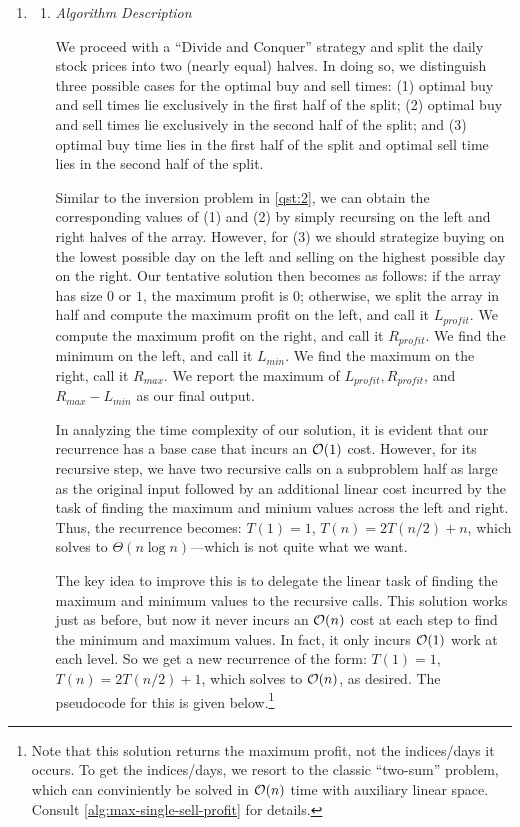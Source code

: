 \documentclass{article}
\begin{document}
\begin{enumerate}[leftmargin={*}, font={\bf}, label={\arabic*.}, ref={\arabic*}]
  \item \label{qst:4}
    \begin{enumerate}
      \item \label{qst:4a}
        {\it Algorithm Description}

        We proceed with a ``Divide and Conquer'' strategy and split the daily stock prices into
        two (nearly equal) halves. In doing so, we distinguish three possible cases for the optimal
        buy and sell times: (1) optimal buy and sell times lie exclusively in the first half of
        the split; (2) optimal buy and sell times lie exclusively in the second half of the split;
        and (3) optimal buy time lies in the first half of the split and optimal sell time lies in
        the second half of the split.

        Similar to the inversion problem in \ref{qst:2}, we can obtain the corresponding values
        of (1) and (2) by simply recursing on the left and right halves of the array. However,
        for (3) we should strategize buying on the lowest possible day on the left and selling
        on the highest possible day on the right. Our tentative solution then becomes as follows:
        if the array has size $0$ or $1$, the maximum profit is $0$; otherwise, we split the array
        in half and compute the maximum profit on the left, and call it $L_{profit}$. We compute
        the maximum profit on the right, and call it $R_{profit}$. We find the minimum on the left,
        and call it $L_{min}$. We find the maximum on the right, call it $R_{max}$. We report the
        maximum of $L_{profit}, R_{profit}$, and $R_{max} - L_{min}$ as our final output.

        In analyzing the time complexity of our solution, it is evident that our recurrence has a
        base case that incurs an $\operatorname*{\mathcal{O}}(1)$ cost. However, for its recursive step, we have two
        recursive calls on a subproblem half as large as the original input followed by an
        additional linear cost incurred by the task of finding the maximum and minium values across
        the left and right. Thus, the recurrence becomes: $T(1) = 1$, $T(n) = 2T (n/2) + n$, which
        solves to $\Theta(n \log n)$---which is not quite what we want.

        The key idea to improve this is to delegate the linear task of finding the maximum and
        minimum values to the recursive calls. This solution works just as before, but now it never
        incurs an $\operatorname*{\mathcal{O}}(n)$ cost at each step to find the minimum and maximum values. In fact, it
        only incurs $\operatorname*{\mathcal{O}}(1)$ work at each level. So we get a new recurrence of the form: $T(1) = 1$,
        $T(n) = 2T(n/2) + 1$, which solves to $\operatorname*{\mathcal{O}}(n)$, as desired. The pseudocode for this is given
        below.\footnote{
          Note that this solution returns the maximum profit, not the indices/days it occurs. To
          get the indices/days, we resort to the classic ``two-sum'' problem, which can conviniently
          be solved in $\operatorname*{\mathcal{O}}(n)$ time with auxiliary linear space. Consult
          \autoref{alg:max-single-sell-profit} for details.
        }


\end{enumerate}
\end{enumerate}
\end{document}
